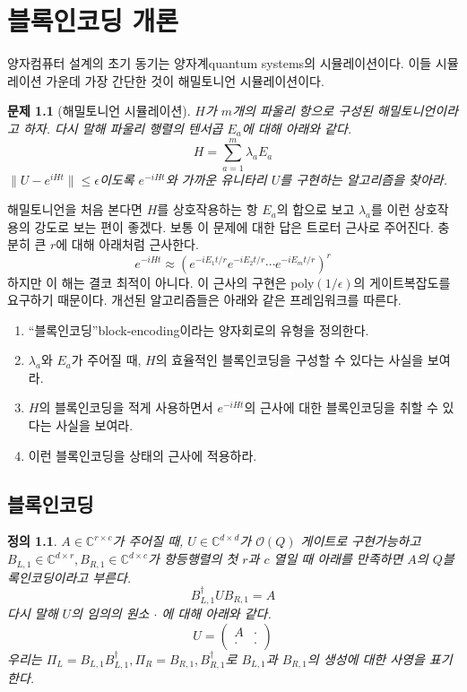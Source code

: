 \documentclass[a4paper,atbegshi,chapter]{oblivoir}
\newtheorem{prob}{문제}[chapter]
\newtheorem{defn}{정의}[chapter]
\begin{document}
\chapter{블록인코딩 개론}
양자컴퓨터 설계의 초기 동기는 양자계{\footnotesize quantum systems}의 
시뮬레이션이다. 이들 시뮬레이션 가운데 가장 간단한 것이 해밀토니언 시뮬레이션이다.
\begin{prob}[해밀토니언 시뮬레이션]
  $H$가 $m$개의 파울리 항으로 구성된 해밀토니언이라고 하자. 다시 말해 파울리
  행렬의 텐서곱 $E_a$에 대해 아래와 같다. 
  \[
    H=\sum_{a=1}^m\lambda_aE_a
  \]
  $\|U-e^{iHt}\|\leq\epsilon$이도록 $e^{-iHt}$와 가까운 유니타리 $U$를 구현하는
  알고리즘을 찾아라.
\end{prob}
해밀토니언을 처음 본다면 $H$를 상호작용하는 항 $E_a$의 합으로 보고 $\lambda_a$를
이런 상호작용의 강도로 보는 편이 좋겠다. 보통 이 문제에 대한 답은 트로터
근사로 주어진다. 충분히 큰 $r$에 대해 아래처럼 근사한다.
\[
  e^{-iHt}\approx(e^{-iE_1t/r}e^{-iE_2t/r}\cdots e^{-iE_mt/r})^r
\]
하지만 이 해는 결코 최적이 아니다. 이 근사의 구현은 $\textrm{poly}(1/\epsilon)$의
게이트복잡도를 요구하기 때문이다. 개선된 알고리즘들은 아래와 같은 프레임워크를
따른다.
\begin{enumerate}[label=(\roman*)]
  \item ``블록인코딩''{\footnotesize block-encoding}이라는 양자회로의 유형을
    정의한다. 
  \item $\lambda_a$와 $E_a$가 주어질 때, $H$의 효율적인 블록인코딩을 구성할
    수 있다는 사실을 보여라.
  \item $H$의 블록인코딩을 적게 사용하면서 $e^{-iHt}$의 근사에 대한 블록인코딩을
    취할 수 있다는 사실을 보여라.
  \item 이런 블록인코딩을 상태의 근사에 적용하라. 
\end{enumerate}
\section{블록인코딩}
\begin{defn} $A\in\mathbb{C}^{r\times c}$가 주어질 때, $U\in\mathbb{C}^{d\times 
  d}$가 $\mathcal{O}(Q)$ 게이트로 구현가능하고 $B_{L,1}\in\mathbb{C}^{d\times r},
  B_{R,1}\in\mathbb{C}^{d\times c}$가 항등행렬의 첫 $r$과 $c$ 열일 때
  아래를 만족하면 $A$의 $Q$블록인코딩이라고 부른다.
  \[
    B^{\dagger}_{L,1}UB_{R,1}=A
  \]
  다시 말해 $U$의 임의의 원소
  $\cdot$ 에 대해 아래와 같다.  
  \[
    U=\begin{pmatrix}A &\cdot\\\cdot &\cdot\end{pmatrix}
  \]
  우리는 $\Pi_L=B_{L,1}B_{L,1}^{\dagger}, \Pi_R=B_{R,1},B_{R,1}^{\dagger}$로 
  $B_{L,1}$과 $B_{R,1}$의 생성에 대한 사영을 표기한다.
\end{defn}
\end{document}
